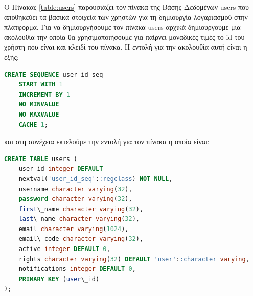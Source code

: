 Ο Πίνακας \ref{table:users} παρουσιάζει τον πίνακα της Βάσης Δεδομένων \textlatin{users} που αποθηκεύει τα βασικά στοιχεία των χρηστών για τη δημιουργία λογαριασμού στην πλατφόρμα. Για να δημιουργήσουμε τον πίνακα \textlatin{users} αρχικά δημιουργούμε μια ακολουθία την οποία θα χρησιμοποιήσουμε για παίρνει μοναδικές τιμές το \textlatin{id} του χρήστη που είναι και κλειδί του πίνακα. Η εντολή για την ακολουθία αυτή είναι η εξής:
{\latintext
\begin{lstlisting}[language=SQL]
CREATE SEQUENCE user_id_seq
    START WITH 1
    INCREMENT BY 1
    NO MINVALUE
    NO MAXVALUE
    CACHE 1;
\end{lstlisting}
}
και στη συνέχεια εκτελούμε την εντολή για τον πίνακα η οποία είναι:
{\latintext
\begin{lstlisting}[language=SQL]
CREATE TABLE users (
    user_id integer DEFAULT
    nextval('user_id_seq'::regclass) NOT NULL,
    username character varying(32),
    password character varying(32),
    first\_name character varying(32),
    last\_name character varying(32),
    email character varying(1024),
    email\_code character varying(32),
    active integer DEFAULT 0,
    rights character varying(32) DEFAULT 'user'::character varying,
    notifications integer DEFAULT 0,
    PRIMARY KEY (user\_id)
);
\end{lstlisting}
}


